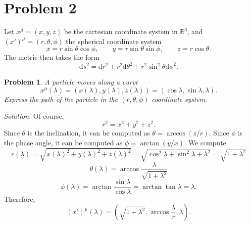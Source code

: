 \documentclass[11pt, letterpaper]{article}
\theoremstyle{plain}
\newtheorem{problem}{Problem}[section]
\begin{document}
\section{Problem 2}

Let $x^\mu =(x,y,z)$ be the cartesian coordinate system in $\mathbb{R} ^3$, and $(x')^\mu =(r,\theta ,\phi )$ the spherical coordinate system
\[
	x=r \sin \theta \cos \phi ,\qquad y=r \sin \theta \sin \phi  ,\qquad z=r \cos \theta 
.\]
The metric then takes the form
\[
	\mathrm{d} s^2=\mathrm{d} r^2+r^2 \mathrm{d} \theta ^2+r^2 \sin^2\theta \mathrm{d} \phi ^2
.\]

\begin{problem}
	A particle moves along a curve
	\[
		x^\mu (\lambda )=(x(\lambda ),y(\lambda ),z(\lambda ))=(\cos \lambda ,\sin \lambda ,\lambda )
	.\]
	Express the path of the particle in the $(r,\theta ,\phi )$ coordinate system.
\end{problem}
\noindent\emph{Solution.} Of course,
\[
	r^2=x^2+y^2+z^2
.\]
Since $\theta $ is the inclination, it can be computed as $\theta =\arccos (z/r)$. Since $\phi $ is the phase angle, it can be computed as $\phi =\arctan (y/x)$. We compute
\[
	r(\lambda )=\sqrt{x(\lambda )^2+y(\lambda )^2+z(\lambda )^2} =\sqrt{\cos ^2\lambda +\sin ^2\lambda +\lambda ^2} =\sqrt{1+\lambda ^2} 
\]
\[
	\theta (\lambda )=\arccos \frac{\lambda }{\sqrt{1+\lambda ^2} } 
\]
\[
	\phi (\lambda )=\arctan \frac{\sin \lambda }{\cos \lambda } =\arctan \tan \lambda =\lambda 
.\]
Therefore,
\[
	(x')^\mu (\lambda )=\left( \sqrt{1+\lambda ^2} ,\arccos \frac{\lambda }{r} ,\lambda  \right) 
.\]
\end{document}
